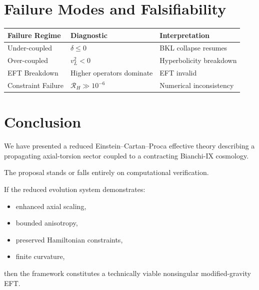\documentclass[11pt]{article}
\begin{document}
\section{Failure Modes and Falsifiability}

\begin{center}
\begin{tabular}{lll}
\toprule
Failure Regime & Diagnostic & Interpretation \\
\midrule
Under-coupled & $\delta \le 0$ & BKL collapse resumes \\
Over-coupled & $v_L^2 < 0$ & Hyperbolicity breakdown \\
EFT Breakdown & Higher operators dominate & EFT invalid \\
Constraint Failure & $\mathcal R_H \gg 10^{-6}$ & Numerical inconsistency \\
\bottomrule
\end{tabular}
\end{center}

\section{Conclusion}

We have presented a reduced Einstein--Cartan--Proca effective theory describing a propagating axial-torsion sector coupled to a contracting Bianchi-IX cosmology.

The proposal stands or falls entirely on computational verification.

If the reduced evolution system demonstrates:

\begin{itemize}
\item enhanced axial scaling,
\item bounded anisotropy,
\item preserved Hamiltonian constraints,
\item finite curvature,
\end{itemize}

then the framework constitutes a technically viable nonsingular modified-gravity EFT.
\end{document}
